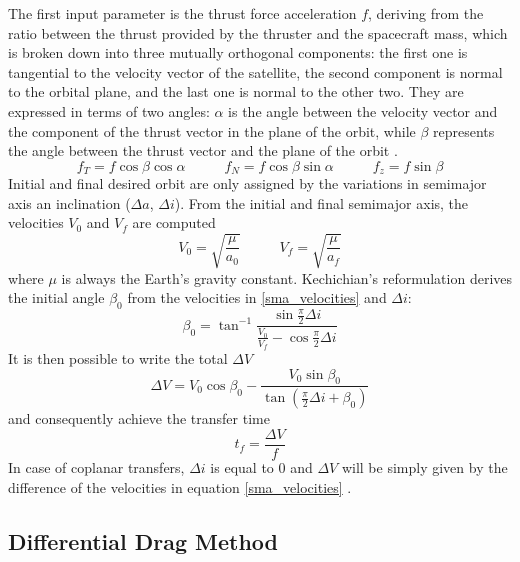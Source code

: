 The first input parameter is the thrust force acceleration $f$, deriving from the ratio between the thrust provided by the thruster and the spacecraft mass, which is broken down into three mutually orthogonal components:
the first one is tangential to the velocity vector of the satellite, the second component is normal to the orbital plane, and the last one is normal to the other two.
They are expressed in terms of two angles: 
$\alpha$ is the angle between the velocity vector and the component of the thrust vector in the plane of the orbit,
while $\beta$ represents the angle between the thrust vector and the plane of the orbit \cite{edelbaum1961propulsion}.
\begin{equation} \label{acceleration_thrust_components}
    f_T = f \cos{\beta} \cos{\alpha} \;\;\;\;\;\;\;\;\;\; f_N = f \cos{\beta} \sin{\alpha} \;\;\;\;\;\;\;\;\;\; f_z = f \sin{\beta}
\end{equation}
Initial and final desired orbit are only assigned by the variations in semimajor axis an inclination ($\Delta a$, $\Delta i$).
From the initial and final semimajor axis, the velocities $V_0$ and $V_f$ are computed 
\begin{equation} \label{sma_velocities}
    V_0 = \sqrt{\frac{\mu}{a_0}} \;\;\;\;\;\;\;\;\;\; V_f = \sqrt{\frac{\mu}{a_f}}
\end{equation}
where $\mu$ is always the Earth's gravity constant.
Kechichian's reformulation derives the initial angle $\beta_0$ from the velocities in \ref{sma_velocities} and $\Delta i$:
\begin{equation} \label{beta0}
    \beta_0 = \tan^{-1}{\frac{\sin{\frac{\pi}{2}}\Delta i}{\frac{V_0}{V_f} - \cos{\frac{\pi}{2}}\Delta i}}
\end{equation}
It is then possible to write the total $\Delta V$
\begin{equation} \label{deltaV}
    \Delta V = V_0 \cos{\beta_0} - \frac{V_0 \sin{\beta_0}}{\tan{\left(\frac{\pi}{2}\Delta i + \beta_0\right)}}
\end{equation}
and consequently achieve the transfer time
\begin{equation} \label{transfer_time}
    t_f = \frac{\Delta V}{f}
\end{equation}
In case of coplanar transfers, $\Delta i$ is equal to 0 and $\Delta V$ will be simply given by the difference of the velocities in equation \ref{sma_velocities} \cite{kechichian1992reformulation}.

\subsection{Differential Drag Method}

